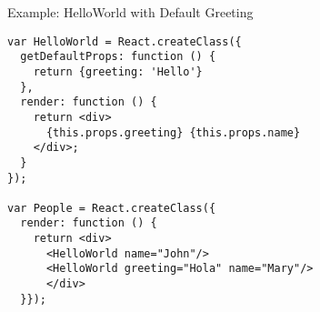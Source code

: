 \documentclass[presentation]{beamer}
\begin{document}
\begin{frame}[fragile,label=sec-20]{Example: HelloWorld with Default Greeting}
 \begin{verbatim}
var HelloWorld = React.createClass({
  getDefaultProps: function () {
    return {greeting: 'Hello'}
  },
  render: function () {
    return <div>
      {this.props.greeting} {this.props.name}
    </div>;
  }
});

var People = React.createClass({
  render: function () {
    return <div>
      <HelloWorld name="John"/>
      <HelloWorld greeting="Hola" name="Mary"/>
      </div>
  }});
\end{verbatim}
\end{frame}
\end{document}

